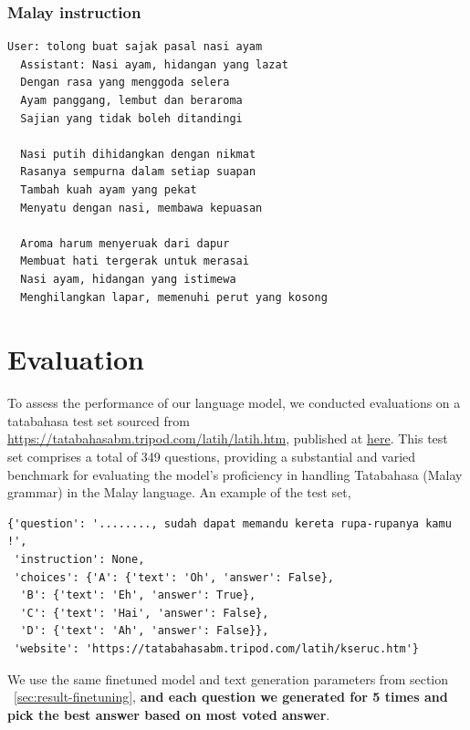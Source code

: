 \documentclass[preprint]{article}
\begin{document}
\subsubsection{Malay instruction}

\begin{lstlisting}[breaklines=true]
  User: tolong buat sajak pasal nasi ayam
  Assistant: Nasi ayam, hidangan yang lazat
  Dengan rasa yang menggoda selera
  Ayam panggang, lembut dan beraroma
  Sajian yang tidak boleh ditandingi
  
  Nasi putih dihidangkan dengan nikmat
  Rasanya sempurna dalam setiap suapan
  Tambah kuah ayam yang pekat
  Menyatu dengan nasi, membawa kepuasan
  
  Aroma harum menyeruak dari dapur
  Membuat hati tergerak untuk merasai
  Nasi ayam, hidangan yang istimewa
  Menghilangkan lapar, memenuhi perut yang kosong
\end{lstlisting}

\section{Evaluation}

To assess the performance of our language model, we conducted evaluations on a tatabahasa test set sourced from \url{https://tatabahasabm.tripod.com/latih/latih.htm}, published at \href{https://github.com/mesolitica/malaysian-dataset/tree/master/llm-benchmark/tatabahasabm.tripod.com}{here}. This test set comprises a total of 349 questions, providing a substantial and varied benchmark for evaluating the model's proficiency in handling Tatabahasa (Malay grammar) in the Malay language. An example of the test set,

\begin{lstlisting}[breaklines=true]
{'question': '........, sudah dapat memandu kereta rupa-rupanya kamu !',
 'instruction': None,
 'choices': {'A': {'text': 'Oh', 'answer': False},
  'B': {'text': 'Eh', 'answer': True},
  'C': {'text': 'Hai', 'answer': False},
  'D': {'text': 'Ah', 'answer': False}},
 'website': 'https://tatabahasabm.tripod.com/latih/kseruc.htm'}
\end{lstlisting}

We use the same finetuned model and text generation parameters from section ~\ref{sec:result-finetuning}, \textbf{and each question we generated for 5 times and pick the best answer based on most voted answer}.
\end{document}
